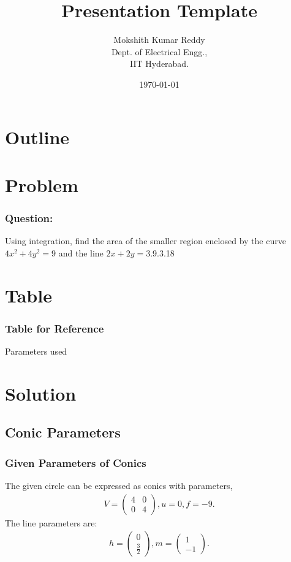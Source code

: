 \documentclass{beamer}
\title{Presentation Template}
\author{Mokshith Kumar Reddy \\ Dept. of Electrical Engg.,\\IIT Hyderabad.}
\date{\today}
\theoremstyle{remark}
\newcommand{\myvec}[1]{\ensuremath{\begin{pmatrix}#1\end{pmatrix}}}
\begin{document}
\begin{frame}
\titlepage
\end{frame}
\begin{frame}
\tableofcontents
\end{frame}
\section*{Outline}
\section{Problem}
\begin{frame}
\frametitle{Question: }
    Using integration, find the area of the smaller region enclosed by the curve $4x^2 + 4y^2 = 9$ and the line $2x + 2y = 3$.\hfill{9.3.18}
\end{frame}
\section{Table}
\begin{frame}
\frametitle{Table for Reference}
\begin{table}[h]
    \centering
    
    \caption{Parameters used}
    \label{}
\end{table}
\end{frame}
\section{Solution}
\subsection{Conic Parameters}
\begin{frame}
\frametitle{Given Parameters of Conics}
The given circle can be expressed as conics with parameters,
\begin{align}
    V=\myvec{4 & 0\\0 & 4}, u=0, f=-9.
\end{align}
The line parameters are:
\begin{align}
    h=\myvec{0\\ \frac{3}{2}}, m=\myvec{1\\-1}.
\end{align}
\end{frame}
\end{document}
